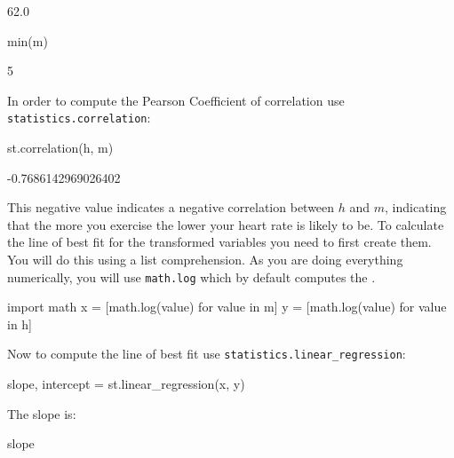 \begin{raw}
62.0
\end{raw}







\begin{pyin}
min(m)
\end{pyin}





\begin{raw}
5
\end{raw}





In order to compute the Pearson Coefficient of correlation use
\texttt{statistics.correlation}:




\begin{pyin}
st.correlation(h, m)
\end{pyin}





\begin{raw}
-0.7686142969026402
\end{raw}





This negative value indicates a negative correlation between \(h\) and \(m\),
indicating that the more you exercise the lower your heart rate is likely to be.
To calculate the line of best fit for the transformed variables you need to first
create them. You will do this using a list comprehension. As you are doing
everything numerically, you will use \texttt{math.log} which by default computes the
.




\begin{pyin}
import math
x = [math.log(value) for value in m]
y = [math.log(value) for value in h]
\end{pyin}

Now to compute the line of best fit use \texttt{statistics.linear\_regression}:




\begin{pyin}
slope, intercept = st.linear_regression(x, y)
\end{pyin}

The slope is:

\begin{pyin}
slope
\end{pyin}





